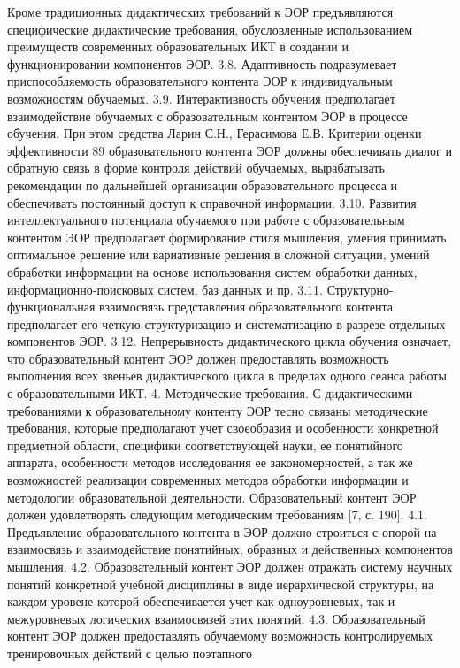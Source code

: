 Кроме традиционных дидактических требований к ЭОР предъявляются
специфические дидактические требования, обусловленные использованием
преимуществ современных образовательных ИКТ в создании и функционировании компонентов ЭОР.
3.8. Адаптивность подразумевает приспособляемость образовательного
контента ЭОР к индивидуальным возможностям обучаемых.
3.9. Интерактивность обучения предполагает взаимодействие обучаемых
с образовательным контентом ЭОР в процессе обучения. При этом средства Ларин С.Н., Герасимова Е.В. Критерии оценки эффективности
89
образовательного контента ЭОР должны обеспечивать диалог и обратную
связь в форме контроля действий обучаемых, вырабатывать рекомендации по
дальнейшей организации образовательного процесса и обеспечивать постоянный доступ к справочной информации.
3.10. Развития интеллектуального потенциала обучаемого при работе с образовательным контентом ЭОР предполагает формирование стиля мышления,
умения принимать оптимальное решение или вариативные решения в сложной
ситуации, умений обработки информации на основе использования систем
обработки данных, информационно-поисковых систем, баз данных и пр.
3.11. Структурно-функциональная взаимосвязь представления образовательного контента предполагает его четкую структуризацию и систематизацию в разрезе отдельных компонентов ЭОР.
3.12. Непрерывность дидактического цикла обучения означает, что образовательный контент ЭОР должен предоставлять возможность выполнения всех звеньев дидактического цикла в пределах одного сеанса работы с
образовательными ИКТ.
4. Методические требования.
С дидактическими требованиями к образовательному контенту ЭОР
тесно связаны методические требования, которые предполагают учет своеобразия и особенности конкретной предметной области, специфики соответствующей науки, ее понятийного аппарата, особенности методов исследования ее закономерностей, а так же возможностей реализации современных методов обработки информации и методологии образовательной деятельности. Образовательный контент ЭОР должен удовлетворять следующим методическим требованиям [7, с. 190].
4.1. Предъявление образовательного контента в ЭОР должно строиться
с опорой на взаимосвязь и взаимодействие понятийных, образных и действенных компонентов мышления.
4.2. Образовательный контент ЭОР должен отражать систему научных
понятий конкретной учебной дисциплины в виде иерархической структуры,
на каждом уровене которой обеспечивается учет как одноуровневых, так и
межуровневых логических взаимосвязей этих понятий.
4.3. Образовательный контент ЭОР должен предоставлять обучаемому
возможность контролируемых тренировочных действий с целью поэтапного
